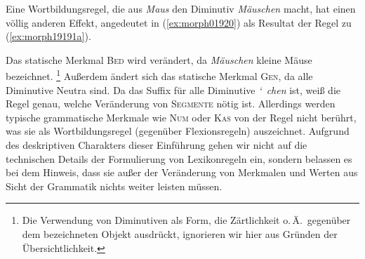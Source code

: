 \begin{exe}
\end{exe}

Eine Wortbildungsregel, die \zB aus \textit{Maus} den Diminutiv \textit{Mäuschen} macht, hat einen völlig anderen Effekt, angedeutet in (\ref{ex:morph01920}) als Resultat der Regel zu (\ref{ex:morph19191a}).

\begin{exe}
\end{exe}

Das statische Merkmal \textsc{Bed} wird verändert, da \textit{Mäuschen} kleine Mäuse bezeichnet.%
\footnote{Die Verwendung von Diminutiven als Form, die Zärtlichkeit o.\,Ä.\ gegenüber dem bezeichneten Objekt ausdrückt, ignorieren wir hier aus Gründen der Übersichtlichkeit.}
Außerdem ändert sich das statische Merkmal \textsc{Gen}, da alle Diminutive Neutra sind.
Da das Suffix für alle Diminutive \mbox{\textit{\char`~chen}} ist, weiß die Regel genau, welche Veränderung von \textsc{Segmente} nötig ist.
Allerdings werden typische grammatische Merkmale wie \textsc{Num} oder \textsc{Kas} von der Regel nicht berührt, was sie als Wortbildungsregel (gegenüber Flexionsregeln) auszeichnet.
Aufgrund des deskriptiven Charakters dieser Einführung gehen wir nicht auf die technischen Details der Formulierung von Lexikonregeln ein, sondern belassen es bei dem Hinweis, dass sie außer der Veränderung von Merkmalen und Werten aus Sicht der Grammatik nichts weiter leisten müssen.




